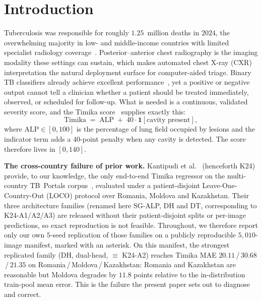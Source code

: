 \documentclass[runningheads]{llncs}
\begin{document}
\section{Introduction}

Tuberculosis was responsible for roughly $1.25$~million deaths in $2024$, the overwhelming majority in low- and middle-income countries with limited specialist radiology coverage~\cite{who2024tb}. Posterior--anterior chest radiography is the imaging modality these settings can sustain, which makes automated chest X-ray (CXR) interpretation the natural deployment surface for computer-aided triage. Binary TB classifiers already achieve excellent performance~\cite{liu2020tbx11k}, yet a positive or negative output cannot tell a clinician whether a patient should be treated immediately, observed, or scheduled for follow-up. What is needed is a continuous, validated severity score, and the Timika score~\cite{ralph2010timika} supplies exactly this:
\begin{equation}
\text{Timika} \;=\; \mathrm{ALP} \;+\; 40 \cdot \mathbf{1}[\text{cavity present}],
\label{eq:timika}
\end{equation}
where $\mathrm{ALP}\in[0,100]$ is the percentage of lung field occupied by lesions and the indicator term adds a $40$-point penalty when any cavity is detected. The score therefore lives in $[0,140]$.

\smallskip\noindent\textbf{The cross-country failure of prior work.}
Kantipudi et al.~\cite{kantipudi2024} (henceforth K24) provide, to our knowledge, the only end-to-end Timika regressor on the multi-country TB~Portals corpus~\cite{tbportals2020}, evaluated under a patient-disjoint Leave-One-Country-Out (LOCO) protocol over Romania, Moldova and Kazakhstan. Their three architecture families (renamed here SG-ALP, DH and DT, corresponding to K24-A1/A2/A3) are released without their patient-disjoint splits or per-image predictions, so exact reproduction is not feasible. Throughout, we therefore report only our own $5$-seed replication of those families on a publicly reproducible $5{,}010$-image manifest, marked with an asterisk. On this manifest, the strongest replicated family (DH, dual-head, $\equiv$ K24-A2) reaches Timika MAE $20.11$\,/\,\textbf{$30.68$}\,/\,$21.35$ on Romania\,/\,Moldova\,/\,Kazakhstan: Romania and Kazakhstan are reasonable but Moldova degrades by $11.8$ points relative to the in-distribution train-pool mean error. This is the failure the present paper sets out to diagnose and correct.
\end{document}
